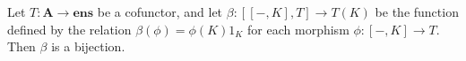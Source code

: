 Let $T: \mathbf{A} \rightarrow \mathbf{ens}$ be a cofunctor, and let $\beta: [[-, K], T] \rightarrow T(K)$ be the function defined by the relation $\beta(\phi) = \phi(K)1_K$ for each morphism $\phi: [-, K] \rightarrow T$. Then $\beta$ is a bijection.
